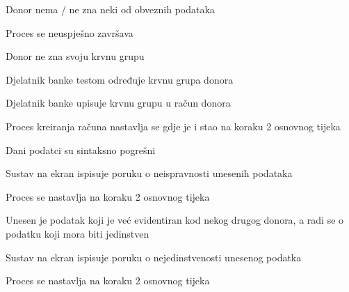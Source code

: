 \begin{packed_item}
\begin{packed_item}
							\item[2.a] Donor nema / ne zna neki od obveznih podataka
							\begin{packed_enum}
								\item Proces se neuspješno završava
							\end{packed_enum}
							
							\item[2.b] Donor ne zna svoju krvnu grupu
                            \begin{packed_enum}
							    \item Djelatnik banke testom određuje krvnu grupa donora
							    \item Djelatnik banke upisuje krvnu grupu u račun donora
							    \item Proces kreiranja računa nastavlja se gdje je i stao na koraku 2 osnovnog tijeka
                            \end{packed_enum}
						
							\item[4.a] Dani podatci su sintaksno pogrešni
							\begin{packed_enum}
								\item Sustav na ekran ispisuje poruku o neispravnosti unesenih podataka
								\item Proces se nastavlja na koraku 2 osnovnog tijeka
							\end{packed_enum}
							
							\item[4.b] Unesen je podatak koji je već evidentiran kod nekog drugog donora, a radi se o podatku koji mora biti jedinstven
							\begin{packed_enum}
								\item Sustav na ekran ispisuje poruku o nejedinstvenosti unesenog podatka
								\item Proces se nastavlja na koraku 2 osnovnog tijeka
							\end{packed_enum}
							
						\end{packed_item}
						
					\end{packed_item}
					
